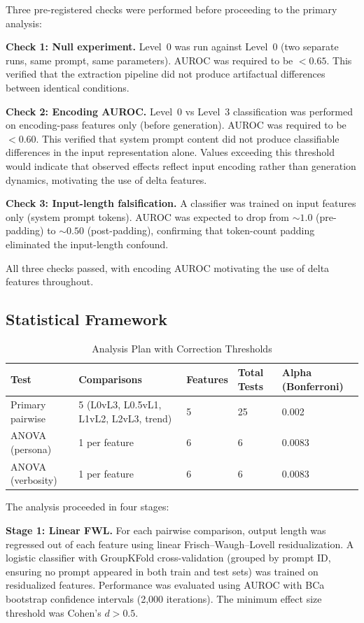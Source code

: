 \documentclass[11pt]{article}
\begin{document}
Three pre-registered checks were performed before proceeding to the primary analysis:

\textbf{Check 1: Null experiment.} Level~0 was run against Level~0 (two separate runs, same prompt, same parameters). AUROC was required to be $< 0.65$. This verified that the extraction pipeline did not produce artifactual differences between identical conditions.

\textbf{Check 2: Encoding AUROC.} Level~0 vs Level~3 classification was performed on encoding-pass features only (before generation). AUROC was required to be $< 0.60$. This verified that system prompt content did not produce classifiable differences in the input representation alone. Values exceeding this threshold would indicate that observed effects reflect input encoding rather than generation dynamics, motivating the use of delta features.

\textbf{Check 3: Input-length falsification.} A classifier was trained on input features only (system prompt tokens). AUROC was expected to drop from ${\sim}1.0$ (pre-padding) to ${\sim}0.50$ (post-padding), confirming that token-count padding eliminated the input-length confound.

All three checks passed, with encoding AUROC motivating the use of delta features throughout.

\subsection{Statistical Framework}
\label{sec:statistical-framework}

\begin{table}[H]
\centering
\caption{Analysis Plan with Correction Thresholds}
\label{tab:analysis-plan}
\begin{tabular}{lllll}
\toprule
Test & Comparisons & Features & Total Tests & Alpha (Bonferroni) \\
\midrule
Primary pairwise & 5 (L0vL3, L0.5vL1, L1vL2, L2vL3, trend) & 5 & 25 & 0.002 \\
ANOVA (persona) & 1 per feature & 6 & 6 & 0.0083 \\
ANOVA (verbosity) & 1 per feature & 6 & 6 & 0.0083 \\
\bottomrule
\end{tabular}
\end{table}

The analysis proceeded in four stages:

\textbf{Stage 1: Linear FWL.} For each pairwise comparison, output length was regressed out of each feature using linear Frisch--Waugh--Lovell residualization. A logistic classifier with GroupKFold cross-validation (grouped by prompt ID, ensuring no prompt appeared in both train and test sets) was trained on residualized features. Performance was evaluated using AUROC with BCa bootstrap confidence intervals (2,000 iterations). The minimum effect size threshold was Cohen's $d > 0.5$.
\end{document}
